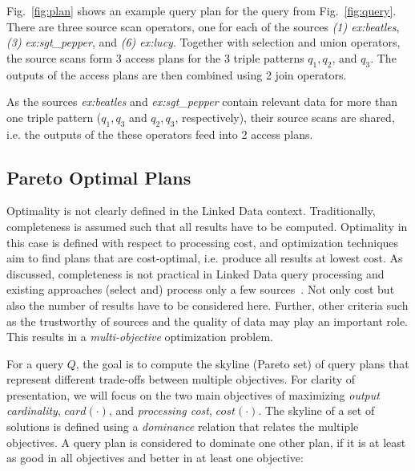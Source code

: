 \begin{example}
  Fig.~\ref{fig:plan} shows an example query plan for the 
  query from Fig.~\ref{fig:query}. There are three source scan
  operators, one for each of the sources \emph{(1) ex:beatles},
  \emph{(3) ex:sgt\_pepper}, and \emph{(6) ex:lucy}. Together with 
  selection and union operators, the source scans form 3 access
  plans for the 3 triple patterns $q_1, q_2$, and $q_3$.  The
  outputs of the access plans are then combined using 2 join operators.

  As the sources \emph{ex:beatles} and \emph{ex:sgt\_pepper} contain
  relevant data for more than one triple pattern ($q_1,q_3$ and
  $q_2,q_3$, respectively), their source scans are shared, i.e. the
  outputs of the these operators feed into 2 access plans.
\end{example}


\subsection{Pareto Optimal Plans} 
Optimality is not clearly defined in the Linked Data context. Traditionally, completeness is assumed such that all results have to be computed. Optimality in this case is defined with respect to processing cost, and optimization techniques aim to find plans that are cost-optimal, i.e. produce all results at lowest cost. As discussed, completeness is not practical in Linked Data query processing and existing approaches (select and) process only a few sources~\cite{harth_data_2010,ladwig_linked_2010}. Not only cost but also the number of results have to be considered here. Further, other criteria such as the trustworthy of sources and the quality of data may play an important role. This results in a \emph{multi-objective} optimization problem. 

For a query $Q$, %
the goal is to compute the skyline (Pareto set) of query plans that represent different trade-offs between multiple objectives. For clarity of presentation, we will focus on the two main objectives of maximizing \emph{output cardinality}, $card(\cdot)$, and \emph{processing cost}, $cost(\cdot)$. 
The skyline of a set of solutions is defined using a \emph{dominance}
relation that relates the multiple objectives. A query plan is considered to dominate one other plan, if it is at least as good in all objectives and better in at least one objective:

